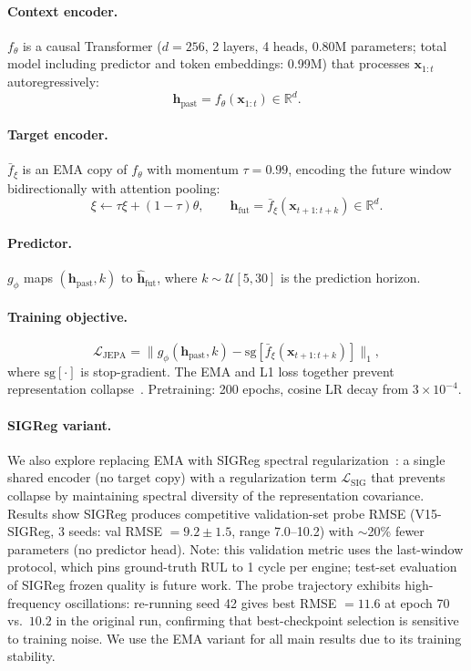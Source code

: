 \documentclass{article}
\newcommand{\R}{\mathbb{R}}
\newcommand{\x}{\mathbf{x}}
\newcommand{\h}{\mathbf{h}}
\newcommand{\loss}{\mathcal{L}}
\newcommand{\encoder}{f_\theta}
\newcommand{\predictor}{g_\phi}
\newcommand{\target}{\bar{f}_\xi}
\begin{document}
\paragraph{Context encoder.} $\encoder$ is a causal Transformer ($d = 256$, 2 layers, 4 heads, 0.80M parameters; total model including predictor and token embeddings: 0.99M) that processes $\x_{1:t}$ autoregressively:
\begin{equation}
  \h_\text{past} = \encoder(\x_{1:t}) \in \R^d.
  \label{eq:context}
\end{equation}

\paragraph{Target encoder.} $\target$ is an EMA copy of $\encoder$ with momentum $\tau = 0.99$, encoding the future window bidirectionally with attention pooling:
\begin{equation}
  \xi \leftarrow \tau\xi + (1-\tau)\theta, \qquad \h_\text{fut} = \target(\x_{t+1:t+k}) \in \R^d.
  \label{eq:ema}
\end{equation}

\paragraph{Predictor.} $\predictor$ maps $(\h_\text{past}, k)$ to $\hat{\h}_\text{fut}$, where $k \sim \mathcal{U}[5,30]$ is the prediction horizon.

\paragraph{Training objective.}
\begin{equation}
  \loss_\text{JEPA} = \| \predictor(\h_\text{past}, k) - \text{sg}[\target(\x_{t+1:t+k})] \|_1,
  \label{eq:jepa_loss}
\end{equation}
where $\text{sg}[\cdot]$ is stop-gradient. The EMA and L1 loss together prevent representation collapse~\citep{grill2020byol}. Pretraining: 200 epochs, cosine LR decay from $3 \times 10^{-4}$.

\paragraph{SIGReg variant.} We also explore replacing EMA with SIGReg spectral regularization~\citep{balestriero2025lejepa}: a single shared encoder (no target copy) with a regularization term $\loss_\text{SIG}$ that prevents collapse by maintaining spectral diversity of the representation covariance. Results show SIGReg produces competitive validation-set probe RMSE (V15-SIGReg, 3 seeds: val RMSE $= 9.2 \pm 1.5$, range 7.0--10.2) with $\sim$20\% fewer parameters (no predictor head). Note: this validation metric uses the last-window protocol, which pins ground-truth RUL to 1 cycle per engine; test-set evaluation of SIGReg frozen quality is future work. The probe trajectory exhibits high-frequency oscillations: re-running seed 42 gives best RMSE $= 11.6$ at epoch 70 vs.\ $10.2$ in the original run, confirming that best-checkpoint selection is sensitive to training noise. We use the EMA variant for all main results due to its training stability.
\end{document}

